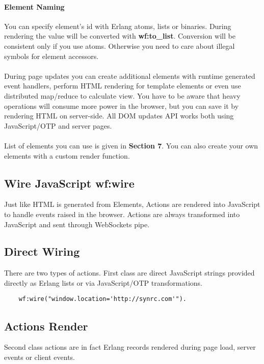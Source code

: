 \paragraph{\bf Element Naming}
You can specify element's id with Erlang atoms,
lists or binaries. During rendering the value will be converted
with {\bf wf:to\_list}. Conversion will be consistent only if you use atoms.
Otherwise you need to care about illegal symbols for element accessors.

\paragraph{}
During page updates you can create additional elements with
runtime generated event handlers, perform HTML rendering for
template elements or even use distributed map/reduce to calculate view.
You have to be aware that heavy operations will consume
more power in the browser, but you can save it by rendering
HTML on server-side. All DOM updates API works both using
JavaScript/OTP and server pages.

\paragraph{}
List of elements you can use is given in {\bf Section 7}. You can also create
your own elements with a custom render function.

\subsection{Wire JavaScript \bf{wf:wire}}
Just like HTML is generated from Elements, Actions are rendered into
JavaScript to handle events raised in the browser. Actions are always
transformed into JavaScript and sent through WebSockets pipe.

\subsection*{Direct Wiring}
There are two types of actions. First class are direct JavaScript
strings provided directly as Erlang lists or via JavaScript/OTP
transformations.

\vspace{1\baselineskip}
\begin{lstlisting}
    wf:wire("window.location='http://synrc.com'").
\end{lstlisting}

\subsection*{Actions Render}
Second class actions are in fact Erlang records
rendered during page load, server events or client events.

